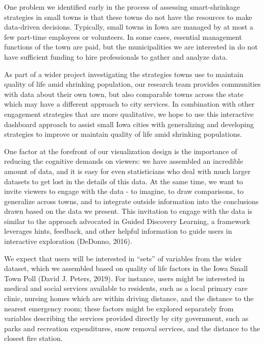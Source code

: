 \documentclass[print]{nuthesis}
\begin{document}
One problem we identified early in the process of assessing smart-shrinkage strategies in small towns is that these towns do not have the resources to make data-driven decisions. Typically, small towns in Iowa are managed by at most a few part-time employees or volunteers. In some cases, essential management functions of the town are paid, but the municipalities we are interested in do not have sufficient funding to hire professionals to gather and analyze data.

As part of a wider project investigating the strategies towns use to maintain quality of life amid shrinking population, our research team provides communities with data about their own town, but also comparable towns across the state which may have a different approach to city services. In combination with other engagement strategies that are more qualitative, we hope to use this interactive dashboard approach to assist small Iowa cities with generalizing and developing strategies to improve or maintain quality of life amid shrinking populations.

One factor at the forefront of our visualization design is the importance of reducing the cognitive demands on viewers: we have assembled an incredible amount of data, and it is easy for even statisticians who deal with much larger datasets to get lost in the details of this data. At the same time, we want to invite viewers to engage with the data - to imagine, to draw comparisons, to generalize across towns, and to integrate outside information into the conclusions drawn based on the data we present.
This invitation to engage with the data is similar to the approach advocated in Guided Discovery Learning, a framework leverages hints, feedback, and other helpful information to guide users in interactive exploration (DeDonno, 2016).

We expect that users will be interested in ``sets'' of variables from the wider dataset, which we assembled based on quality of life factors in the Iowa Small Town Poll (David J. Peters, 2019). For instance, users might be interested in medical and social services available to residents, such as a local primary care clinic, nursing homes which are within driving distance, and the distance to the nearest emergency room; these factors might be explored separately from variables describing the services provided directly by city government, such as parks and recreation expenditures, snow removal services, and the distance to the closest fire station.
\end{document}

